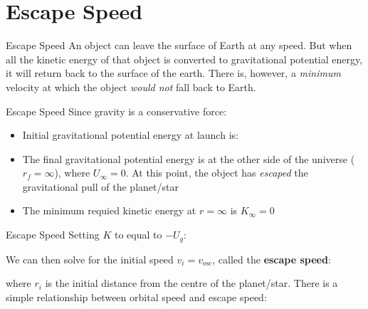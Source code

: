 \documentclass[12pt,compress,aspectratio=169]{beamer}
\begin{document}
\section{Escape Speed}

\begin{frame}{Escape Speed}
  An object can leave the surface of Earth at any speed. But when all the
  kinetic energy of that object is converted to gravitational potential energy,
  it will return back to the surface of the earth. There is, however, a
  \emph{minimum} velocity at which the object \emph{would not} fall back to
  Earth.
\end{frame}



\begin{frame}{Escape Speed}
  Since gravity is a conservative force:

  \begin{itemize}
  \item Initial gravitational potential energy at launch is:

  \item The final gravitational potential energy is at the other side of the
    universe ($r_f=\infty$), where $U_\infty=0$. At this point, the object has
    \emph{escaped} the gravitational pull of the planet/star
  \item The minimum requied kinetic energy at $r=\infty$ is $K_\infty=0$
  \end{itemize}
\end{frame}



\begin{frame}{Escape Speed}%
  Setting $K$ to equal to $-U_g$:


  We can then solve for the initial speed $v_i=v_\text{esc}$, called the
  \textbf{escape speed}: %


  where $r_i$ is the initial distance from the centre of the planet/star. There
  is a simple relationship between orbital speed and escape speed:

\end{frame}
\end{document}
